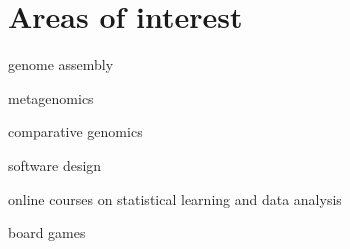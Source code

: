 \section{Areas of interest}
\begin{innerlist}
\item genome assembly
\item metagenomics
\item comparative genomics
\item software design
\item online courses on statistical learning and data analysis
\item board games
\end{innerlist}
